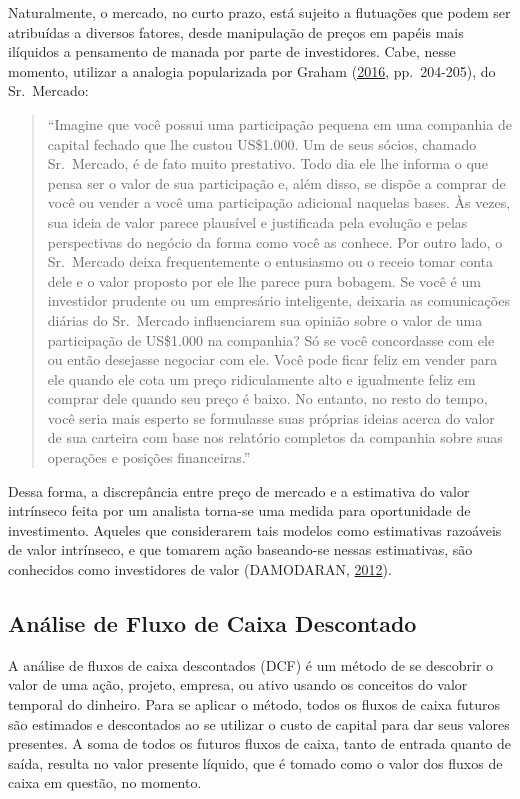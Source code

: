 \documentclass[grad,numbers]{coppe}
\begin{document}
  Naturalmente, o mercado, no curto prazo, está sujeito a flutuações que podem ser atribuídas a diversos fatores, desde manipulação de preços em papéis mais ilíquidos a pensamento de manada por parte de investidores. Cabe, nesse momento, utilizar a analogia popularizada por Graham (\protect\hyperlink{ref-graham2016}{2016}, pp.~204-205), do Sr.~Mercado:
  \begin{quote}
  ``Imagine que você possui uma participação pequena em uma companhia de capital fechado que lhe custou US\$1.000. Um de seus sócios, chamado Sr.~Mercado, é de fato muito prestativo. Todo dia ele lhe informa o que pensa ser o valor de sua participação e, além disso, se dispõe a comprar de você ou vender a você uma participação adicional naquelas bases. Às vezes, sua ideia de valor parece plausível e justificada pela evolução e pelas perspectivas do negócio da forma como você as conhece. Por outro lado, o Sr.~Mercado deixa frequentemente o entusiasmo ou o receio tomar conta dele e o valor proposto por ele lhe parece pura bobagem. Se você é um investidor prudente ou um empresário inteligente, deixaria as comunicações diárias do Sr.~Mercado influenciarem sua opinião sobre o valor de uma participação de US\$1.000 na companhia? Só se você concordasse com ele ou então desejasse negociar com ele. Você pode ficar feliz em vender para ele quando ele cota um preço ridiculamente alto e igualmente feliz em comprar dele quando seu preço é baixo. No entanto, no resto do tempo, você seria mais esperto se formulasse suas próprias ideias acerca do valor de sua carteira com base nos relatório completos da companhia sobre suas operações e posições financeiras.''
  \end{quote}
  Dessa forma, a discrepância entre preço de mercado e a estimativa do valor intrínseco feita por um analista torna-se uma medida para oportunidade de investimento. Aqueles que considerarem tais modelos como estimativas razoáveis de valor intrínseco, e que tomarem ação baseando-se nessas estimativas, são conhecidos como investidores de valor (DAMODARAN, \protect\hyperlink{ref-damodaran2012}{2012}).

  \hypertarget{anuxe1lise-de-fluxo-de-caixa-descontado}{%
  \subsection{Análise de Fluxo de Caixa Descontado}\label{anuxe1lise-de-fluxo-de-caixa-descontado}}

  A análise de fluxos de caixa descontados (DCF) é um método de se descobrir o valor de uma ação, projeto, empresa, ou ativo usando os conceitos do valor temporal do dinheiro. Para se aplicar o método, todos os fluxos de caixa futuros são estimados e descontados ao se utilizar o custo de capital para dar seus valores presentes. A soma de todos os futuros fluxos de caixa, tanto de entrada quanto de saída, resulta no valor presente líquido, que é tomado como o valor dos fluxos de caixa em questão, no momento.
\end{document}
